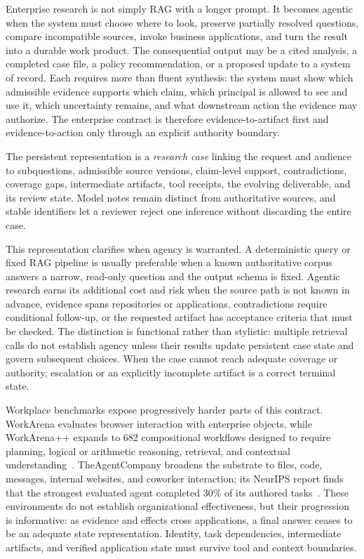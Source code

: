 Enterprise research is not simply RAG with a longer prompt. It becomes agentic when the system must choose where to look, preserve partially resolved questions, compare incompatible sources, invoke business applications, and turn the result into a durable work product. The consequential output may be a cited analysis, a completed case file, a policy recommendation, or a proposed update to a system of record. Each requires more than fluent synthesis: the system must show which admissible evidence supports which claim, which principal is allowed to see and use it, which uncertainty remains, and what downstream action the evidence may authorize. The enterprise contract is therefore evidence-to-artifact first and evidence-to-action only through an explicit authority boundary.

The persistent representation is a \emph{research case} linking the request and audience to subquestions, admissible source versions, claim-level support, contradictions, coverage gaps, intermediate artifacts, tool receipts, the evolving deliverable, and its review state. Model notes remain distinct from authoritative sources, and stable identifiers let a reviewer reject one inference without discarding the entire case.

This representation clarifies when agency is warranted. A deterministic query or fixed RAG pipeline is usually preferable when a known authoritative corpus answers a narrow, read-only question and the output schema is fixed. Agentic research earns its additional cost and risk when the source path is not known in advance, evidence spans repositories or applications, contradictions require conditional follow-up, or the requested artifact has acceptance criteria that must be checked. The distinction is functional rather than stylistic: multiple retrieval calls do not establish agency unless their results update persistent case state and govern subsequent choices. When the case cannot reach adequate coverage or authority, escalation or an explicitly incomplete artifact is a correct terminal state.

Workplace benchmarks expose progressively harder parts of this contract. WorkArena evaluates browser interaction with enterprise objects, while WorkArena++ expands to 682 compositional workflows designed to require planning, logical or arithmetic reasoning, retrieval, and contextual understanding~\cite{drouin2024workarena,boisvert2024workarenaplus}. TheAgentCompany broadens the substrate to files, code, messages, internal websites, and coworker interaction; its NeurIPS report finds that the strongest evaluated agent completed 30\% of its authored tasks~\cite{xu2025agentcompany}. These environments do not establish organizational effectiveness, but their progression is informative: as evidence and effects cross applications, a final answer ceases to be an adequate state representation. Identity, task dependencies, intermediate artifacts, and verified application state must survive tool and context boundaries.

